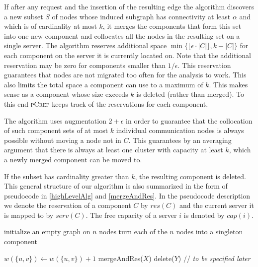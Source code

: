 \documentclass[a4paper,UKenglish,cleveref, autoref, thm-restate,authorcolumns]{lipics-v2019}
\newcommand{\adjDel}{\textsc{pCrep}}
\begin{document}
If after any request and the insertion of the resulting edge the algorithm discovers a new subset $S$ of nodes whose induced subgraph has connectivity at least $\alpha$ and which is of cardinality at most $k$, it merges the components that form this set into one new component and collocates all the nodes in the resulting set on a single server. The algorithm reserves additional space $\min\{\lfloor\epsilon\cdot|C|\rfloor,k-|C|\}$ for each component on the server it is currently located on. Note that the additional reservation may be zero for components smaller than $1/\epsilon$. This reservation guarantees that nodes are not migrated too often for the analysis to work. This also limits the total space a component can use to a maximum of $k$. This makes sense as a component whose size exceeds $k$ is deleted (rather than merged).
To this end \adjDel{} keeps track of the reservations for each component.

The algorithm uses augmentation $2+\epsilon$ in order to guarantee that the collocation of such component sets of at most $k$ individual communication nodes is always possible without moving a node not in $C$. This guarantees by an averaging argument that there is always at least one cluster with capacity at least $k$, which a newly merged component can be moved to.

If the subset has cardinality greater than $k$, the resulting component is deleted.  
This general structure of our algorithm is also summarized in the form of pseudocode 
in \cref{highLevelAlg} and \cref{mergeAndRes}. 
In the pseudocode description we denote the reservation of a component $C$ by $res(C)$ and the current server it is mapped to by $serv(C)$. The free capacity of a server $i$ is denoted by $cap(i)$.

\begin{algorithm}[t]
	\caption{\adjDel{}}
	\label{highLevelAlg}
	\begin{algorithmic}
		\STATE initialize an empty graph on $n$ nodes
		\STATE turn each of the $n$ nodes into a singleton component
		
		\STATE $w(\{u,v\})\gets w(\{u,v\})+1$
		\ENDIF
		\STATE mergeAndRes($X$)
		\ENDIF
		\STATE delete($Y$) // \emph{to be specified later} 
		\ENDIF	
		
		\ENDFOR
		
	\end{algorithmic}
\end{algorithm}
\end{document}
